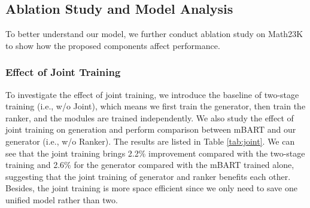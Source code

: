 \begin{table}[h]
    \centering
    \caption{Solution accuracy on MAWPS and Math23K.  refers to the result of test set and  denotes the result of 5-fold cross-validation. ``-'' means that the results are not reported in the original papers.} 
    \label{tab:main_result}
\end{table}

\subsection{Ablation Study and Model Analysis}

To better understand our model, we further conduct ablation study on Math23K to show how the proposed components affect performance.



\subsubsection{Effect of Joint Training}
To investigate the effect of joint training, we introduce the baseline of two-stage training (i.e., w/o Joint), which means we first train the generator, then train the ranker, and the modules are trained independently. We also study the effect of joint training on generation and perform comparison between mBART and our generator (i.e., w/o Ranker).  The results are listed in Table \ref{tab:joint}. We can see that the joint training brings 2.2\% improvement compared with the two-stage training and 2.6\% for the generator compared with the mBART trained alone, suggesting that the joint training of generator and ranker benefits each other. Besides, the joint training is more space efficient since we only need to save one unified model rather than two.

